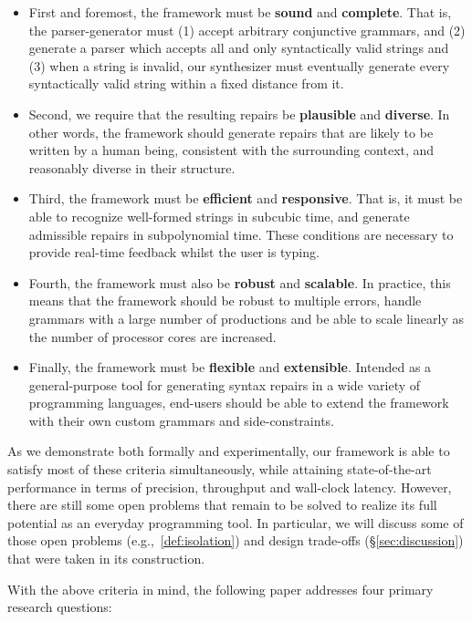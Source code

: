 \documentclass[sigplan,review,anonymous,acmsmall]{acmart}\settopmatter{printfolios=false,printccs=false,printacmref=false}
\begin{document}
\begin{itemize}
  \item First and foremost, the framework must be \textbf{sound} and \textbf{complete}. That is, the parser-generator must (1) accept arbitrary conjunctive grammars, and (2) generate a parser which accepts all and only syntactically valid strings and (3) when a string is invalid, our synthesizer must eventually generate every syntactically valid string within a fixed distance from it.
  \item Second, we require that the resulting repairs be \textbf{plausible} and \textbf{diverse}. In other words, the framework should generate repairs that are likely to be written by a human being, consistent with the surrounding context, and reasonably diverse in their structure.
  \item Third, the framework must be \textbf{efficient} and \textbf{responsive}. That is, it must be able to recognize well-formed strings in subcubic time, and generate admissible repairs in subpolynomial time. These conditions are necessary to provide real-time feedback whilst the user is typing.
  \item Fourth, the framework must also be \textbf{robust} and \textbf{scalable}. In practice, this means that the framework should be robust to multiple errors, handle grammars with a large number of productions and be able to scale linearly as the number of processor cores are increased.
  \item Finally, the framework must be \textbf{flexible} and \textbf{extensible}. Intended as a general-purpose tool for generating syntax repairs in a wide variety of programming languages, end-users should be able to extend the framework with their own custom grammars and side-constraints.
\end{itemize}

As we demonstrate both formally and experimentally, our framework is able to satisfy most of these criteria simultaneously, while attaining state-of-the-art performance in terms of precision, throughput and wall-clock latency. However, there are still some open problems that remain to be solved to realize its full potential as an everyday programming tool. In particular, we will discuss some of those open problems (e.g.,~\ref{def:isolation}) and design trade-offs (\S\ref{sec:discussion}) that were taken in its construction.

With the above criteria in mind, the following paper addresses four primary research questions:
\end{document}
